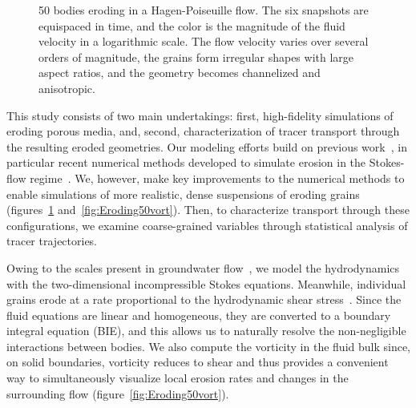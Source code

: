\documentclass{jfm}
\begin{document}
\begin{figure}
\begin{center}
\caption{\label{fig:Eroding50vel} 50 bodies eroding in a
Hagen-Poiseuille flow.  The six snapshots are equispaced in time, and
the color is the magnitude of the fluid velocity in a logarithmic scale.
The flow velocity varies over several orders of magnitude, the grains
form irregular shapes with large aspect ratios, and the geometry becomes
channelized and anisotropic.}
\end{center}
\end{figure}

This study consists of two main undertakings: first, high-fidelity
simulations of eroding porous media, and, second, characterization of
tracer transport through the resulting eroded geometries. Our modeling
efforts build on previous work~\citep{ris-moo-chi-she-zha2012,
moore2013self, moo2017}, in particular recent numerical methods
developed to simulate erosion in the Stokes-flow
regime~\citep{qua-moo2018}. We, however, make key improvements to the
numerical methods to enable simulations of more realistic, dense
suspensions of eroding grains (figures~\ref{fig:Eroding50vel}
and~\ref{fig:Eroding50vort}).  Then, to characterize transport through
these configurations, we examine coarse-grained variables through
statistical analysis of tracer trajectories.

Owing to the scales present in groundwater flow~\citep{bea1972}, we
model the hydrodynamics with the two-dimensional incompressible Stokes
equations.  Meanwhile, individual grains erode at a rate proportional to
the hydrodynamic shear stress~\citep{wan-fel2004,
ris-moo-chi-she-zha2012, moore2013self, par-izu2000}.  Since the fluid
equations are linear and homogeneous, they are converted to a boundary
integral equation (BIE), and this allows us to naturally resolve the
non-negligible interactions between bodies.  We also compute the
vorticity in the fluid bulk since, on solid boundaries, vorticity
reduces to shear and thus provides a convenient way to simultaneously
visualize local erosion rates and changes in the surrounding flow
(figure~\ref{fig:Eroding50vort}).
\end{document}
